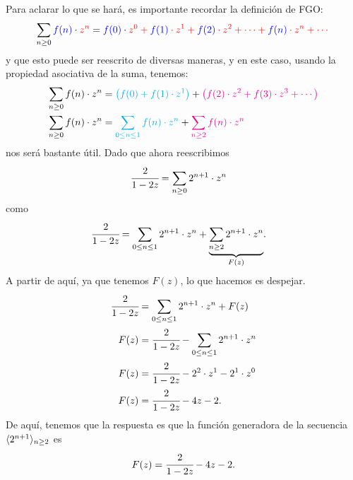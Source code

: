 Para aclarar lo que se hará, es importante recordar la definición de FGO:
\begin{equation*}
    \label{eq:gen-function1}
    \sum_{n\ge 0}{{\color{blue}f(n)}\cdot{\color{red}z^n}} 
    = {\color{blue}f(0)}\cdot \color{red}z^0 + {\color{blue}f(1)}\cdot \color{red}z^1 + {\color{blue}f(2)}\cdot \color{red}z^2 + \cdots + {\color{blue}f(n)}\cdot \color{red}z^n + \cdots  
\end{equation*}
y que esto puede ser reescrito de diversas maneras, y en este caso, usando la propiedad asociativa de la suma, tenemos:
\begin{align*}
    \sum_{n\geq0}{f(n)\cdot z^n} &= {\color{cyan}\left(f(0) + f(1)\cdot z^1\right)} + {\color{magenta}\left(f(2)\cdot z^2 + f(3)\cdot z^3 + \cdots \right)}\\
    \sum_{n\geq0}{f(n)\cdot z^n} &={\color{cyan}\sum_{0\leq n \leq 1}{f(n)\cdot z^n}} + {\color{magenta}\sum_{n\geq2}{f(n)\cdot z^n}}
\end{align*}
nos será bastante útil. Dado que ahora reescribimos
\begin{align*}
    \cfrac{2}{1-2z}&=\sum_{n\geq0}{2^{n+1}\cdot z^n}
\end{align*}
como
\begin{align*}
    \cfrac{2}{1-2z}&=\sum_{0\leq n\leq 1}{2^{n+1}\cdot z^n}+\underset{F(z)}{\underbrace{\sum_{n\geq2}{2^{n+1}\cdot z^n}}}.
\end{align*}
A partir de aquí, ya que tenemos $F(z)$, lo que hacemos es despejar.
\begin{align*}
    \cfrac{2}{1-2z}&=\sum_{0\leq n\leq 1}{2^{n+1}\cdot z^n}+F(z)\\
    F(z)&=\cfrac{2}{1-2z}-\sum_{0\leq n\leq 1}{2^{n+1}\cdot z^n}\\
    F(z)&=\cfrac{2}{1-2z}-2^2\cdot z^1 - 2^1\cdot z^0\\
    F(z)&=\cfrac{2}{1-2z}-4z-2.
\end{align*}
De aquí, tenemos que la respuesta es que la función generadora de la secuencia $\langle2^{n+1}\rangle_{n\geq 2}$ es 
$$F(z)=\cfrac{2}{1-2z}-4z-2.$$

